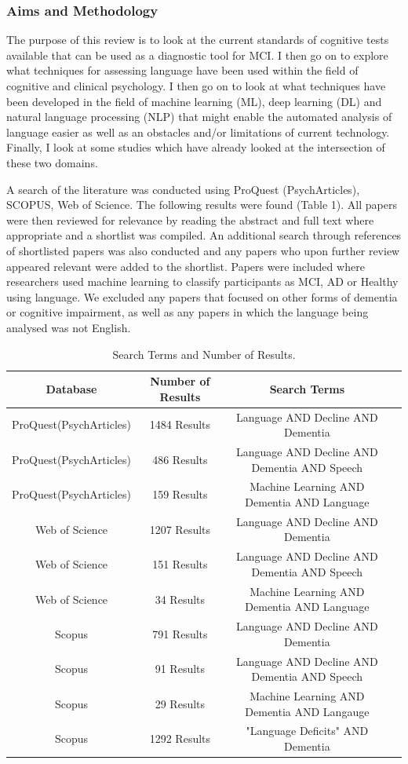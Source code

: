 \documentclass{article}
\begin{document}
\subsubsection{Aims and Methodology}
\par
The purpose of this review is to look at the current standards of cognitive tests available that can be used as a diagnostic tool for MCI. I then go on to explore what techniques for assessing language have been used within the field of cognitive and clinical psychology. I then go on to look at what techniques have been developed in the field of machine learning (ML), deep learning (DL) and natural language processing (NLP) that might enable the automated analysis of language easier as well as an obstacles and/or limitations of current technology. Finally, I look at some studies which have already looked at the intersection of these two domains. \newline
\par
A search of the literature was conducted using ProQuest (PsychArticles), SCOPUS, Web of Science. The following results were found (Table 1). All papers were then reviewed for relevance by reading the abstract and full text where appropriate and a shortlist was compiled. An additional search through references of shortlisted papers was also conducted and any papers who upon further review appeared relevant were added to the shortlist. Papers were included where researchers used machine learning to classify participants as MCI, AD or Healthy using language. We excluded any papers that focused on other forms of dementia or cognitive impairment, as well as any papers in which the language being analysed was not English. 
\begin{table}
	\begin{tabular}{ | c | c | c | p{1cm} |}
		\hline
		Database & Number of Results & Search Terms  \\ \hline
		ProQuest(PsychArticles) & 1484 Results & Language AND Decline AND Dementia \\ \hline
		ProQuest(PsychArticles) & 486 Results  & Language AND Decline AND Dementia AND Speech \\ \hline
		ProQuest(PsychArticles) & 159 Results & Machine Learning AND Dementia AND Language \\ \hline
		Web of Science & 1207 Results  & Language AND Decline AND Dementia   \\ \hline
		Web of Science & 151 Results  & Language AND Decline AND Dementia AND Speech  \\ \hline
		Web of Science & 34 Results & Machine Learning AND Dementia AND Language \\ \hline
		Scopus & 791 Results & Language AND Decline AND Dementia  \\ \hline
		Scopus & 91 Results & Language AND Decline AND Dementia AND Speech   \\ \hline
		Scopus & 29 Results & Machine Learning AND Dementia AND Langauge \\ \hline
		Scopus & 1292 Results & "Language Deficits" AND Dementia \\ \hline
	\end{tabular}
	\caption{\label{tab:table-name}Search Terms and Number of Results.}
\end{table}
\end{document}
